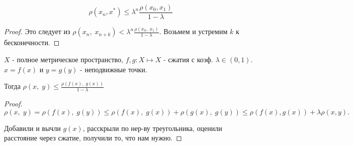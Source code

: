 \begin{statement}\thmslashn
	
	\[
	\rho(x_n, x^*) \le \lambda^n \frac{\rho(x_0, x_1)}{1 - \lambda}
	\]
	\begin{proof} \thmslashn
		
		Это следует из $\rho(x_n,\;x_{n + k}) < \lambda^n \frac{\rho(x_{0},\; x_{1})}{1 - \lambda}$. Возьмем и устремим $k$ к бесконечности.
	\end{proof}
\end{statement}

\begin{consequence} \thmslashn
	
	$X$ - полное метрическое пространство, $f, g: X \mapsto X$ - сжатия с коэф. $\lambda \in (0, 1)$. $x = f(x)$ и $y = g(y)$ - неподвижные точки.
	
	Тогда $\rho(x,\; y) \le \frac{\rho(f(x),\; g(x))}{1- \lambda}$
	\begin{proof} \thmslashn
		
		\[
		\rho(x,\;y) = \rho(f(x),\; g(y)) \le \rho(f(x),\; g(x)) + \rho(g(x),\; g(y)) \le \rho(f(x), g(x)) + \lambda \rho(x, y). 
		\]
		
		Добавили и вычли $g(x)$, расскрыли по нер-ву треугольника, оценили расстояние через сжатие, получили то, что нам нужно.
	\end{proof}
\end{consequence}

